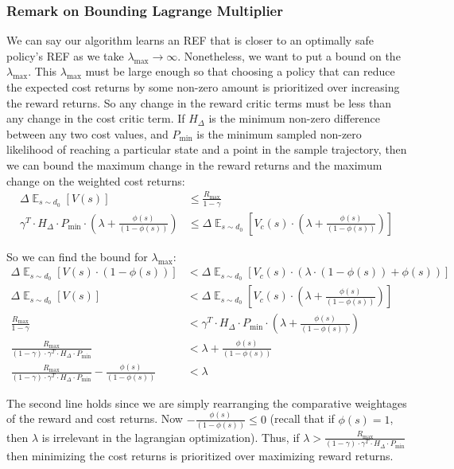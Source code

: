 \documentclass{article}
\theoremstyle{definition}
\DeclareMathOperator*{\E}{\mathbb{E}}
\begin{document}
\subsubsection{Remark on Bounding Lagrange Multiplier}
We can say our algorithm learns an REF that is closer to an optimally safe policy's REF as we take $\lambda_{\max}\rightarrow\infty$. Nonetheless, we want to put a bound on the $\lambda_{\max}$. This $\lambda_{\max}$ must be large enough so that choosing a policy that can reduce the expected cost returns by some non-zero amount is prioritized over increasing the reward returns. So any change in the reward critic terms must be less than any change in the cost critic term. If $H_{\Delta}$ is the minimum non-zero difference between any two cost values, and $P_{\min}$ is the minimum sampled non-zero likelihood of reaching a particular state and a point in the sample trajectory, then we can bound the maximum change in the reward returns and the maximum change on the weighted cost returns:
\begin{align*}
    \Delta \E_{s\sim d_0}[ V(s)] &\leq \frac{R_{\max}}{1-\gamma} \\
    \gamma^T\cdot H_{\Delta}\cdot P_{\min}\cdot (\lambda + \frac{\phi(s)}{(1 - \phi(s))}) &\leq \Delta \E_{s\sim d_0} [V_c(s)\cdot (\lambda + \frac{\phi(s)}{(1 - \phi(s))})]
\end{align*}

So we can find the bound for $\lambda_{\max}$:
\begin{align*}
    \Delta \E_{s\sim d_0} [V(s)\cdot (1-\phi(s))] &< \Delta \E_{s\sim d_0} [V_c(s)\cdot (\lambda\cdot (1 - \phi(s)) + \phi(s)) ]\\
    \Delta \E_{s\sim d_0} [V(s)] &< \Delta \E_{s\sim d_0} [V_c(s)\cdot (\lambda + \frac{\phi(s)}{(1 - \phi(s))}) ]\\
    \frac{R_{\max}}{1-\gamma} &< \gamma^T\cdot H_{\Delta}\cdot P_{\min}\cdot (\lambda+\frac{\phi(s)}{(1 - \phi(s))})\\
    \frac{R_{\max}}{(1-\gamma)\cdot\gamma^T\cdot H_{\Delta}\cdot P_{\min}} &<\lambda+\frac{\phi(s)}{(1 - \phi(s))} \\
    \frac{R_{\max}}{(1-\gamma)\cdot\gamma^T\cdot H_{\Delta}\cdot P_{\min}} - \frac{\phi(s)}{(1-\phi(s))} &<\lambda
\end{align*}

The second line holds since we are simply rearranging the comparative weightages of the reward and cost returns. Now $- \frac{\phi(s)}{(1-\phi(s))}\leq 0$ (recall that if $\phi(s)=1$, then $\lambda$ is irrelevant in the lagrangian optimization). Thus, if $\lambda>\frac{R_{\max}}{(1-\gamma)\cdot\gamma^T\cdot H_{\Delta}\cdot P_{\min}}$ then minimizing the cost returns is prioritized over maximizing reward returns. 
\end{document}
